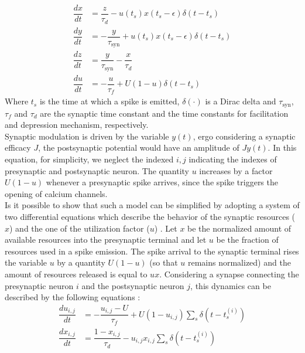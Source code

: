 \documentclass[a4paper, 12pt, twoside, openright]{book}
\begin{document}
\begin{equation}
    \label{eq:STP_tosdyks98}
    \begin{split}
    \dfrac{dx}{dt} &= \dfrac{z}{\tau_d} - u(t_s)x(t_s -\epsilon) \delta (t-t_s) \\
    \dfrac{dy}{dt} &= -\dfrac{y}{\tau_{\text{syn}}} + u(t_s)x(t_s-\epsilon) \delta (t-t_s) \\
    \dfrac{dz}{dt} &= \dfrac{y}{\tau_{\text{syn}}} - \dfrac{x}{\tau_{d}} \\
    \dfrac{du}{dt} &= -\dfrac{u}{\tau_f} + U(1-u)\delta (t-t_s)
    \end{split}
\end{equation}
Where $t_s$ is the time at which a spike is emitted, $\delta (\cdot)$ is a Dirac delta and $\tau_{\text{syn}}$, $\tau_f$ and $\tau_d$ are the synaptic time constant and the time constants for facilitation and depression mechanism, respectively.\\
Synaptic modulation is driven by the variable $y(t)$, ergo considering a synaptic efficacy $J$, the postsynaptic potential would have an amplitude of $Jy(t)$. In this equation, for simplicity, we neglect the indexed $i,j$ indicating the indexes of presynaptic and postsynaptic neuron. The quantity $u$ increases by a factor $U(1-u)$ whenever a presynaptic spike arrives, since the spike triggers the opening of calcium channels.\\
Is it possible to show that such a model can be simplified by adopting a system of two differential equations which describe the behavior of the synaptic resources ($x$) and the one of the utilization factor ($u$) \cite{tsodyks1998}. Let $x$ be the normalized amount of available resources into the presynaptic terminal and let $u$ be the fraction of resources used in a spike emission. The spike arrival to the synaptic terminal rises the variable $u$ by a quantity $U(1-u)$ (so that $u$ remains normalized) and the amount of resources released is equal to $ux$. Considering a synapse connecting the presynaptic neuron $i$ and the postsynaptic neuron $j$, this dynamics can be described by the following equations \cite{Mongillo2008}:
\begin{equation}
    \label{eq:STP}
    \begin{split}
    \dfrac{du_{i,j}}{dt} &= -\dfrac{u_{i,j} - U}{\tau_f} + U(1-u_{i,j})\sum_s\delta (t-t_s^{(i)}) \\
    \dfrac{dx_{i,j}}{dt} &= \dfrac{1-x_{i,j}}{\tau_d} - u_{i,j}x_{i,j} \sum_s\delta (t-t_s^{(i)})
    \end{split}
\end{equation}
\end{document}
